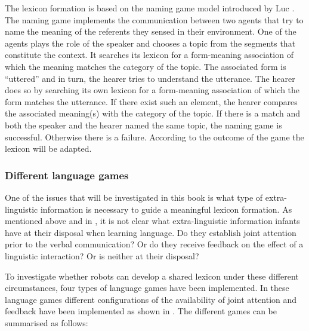 The lexicon formation is based on the naming game model introduced by Luc \citet{steels:1996a}. The naming game implements the communication between two agents that try to name the meaning of the referents they sensed in their environment. One of the agents plays the role of the speaker and chooses a topic from the segments that constitute the context. It searches its lexicon for a form-meaning association of which the meaning matches the category of the topic. The associated form is ``uttered'' and in turn, the hearer tries to understand the utterance. The hearer does so by searching its own lexicon for a form-meaning association of which the form matches the utterance. If there exist such an element, the hearer compares the associated meaning(s) with the category of the topic. If there is a match and both the speaker and the hearer named the same topic, the naming game is successful. Otherwise there is a failure. According to the outcome of the game the lexicon will be adapted. 

\subsubsection{Different language games}

One of the issues that will be investigated in this book is what type of extra-linguistic information is necessary to guide a meaningful lexicon formation. As mentioned above and in , it is not clear what extra-linguistic information infants have at their disposal when learning language. Do they establish joint attention prior to the verbal communication? Or do they receive feedback on the effect of a linguistic interaction? Or is neither at their disposal? 

To investigate whether robots can develop a shared lexicon under these different circumstances, four types of language games have been implemented. In these language games different configurations of the availability of joint attention and feedback have been implemented as shown in . The different games can be summarised as follows:

